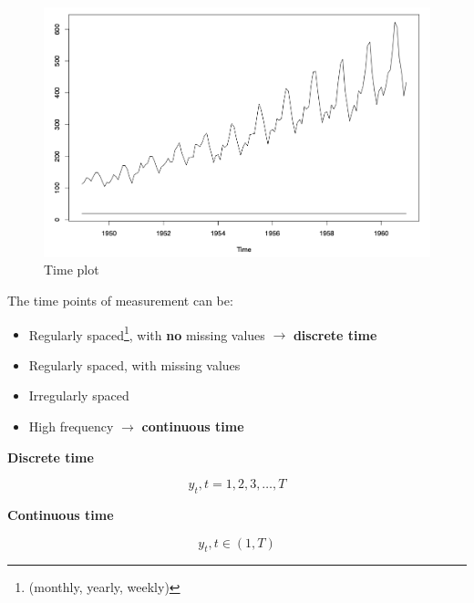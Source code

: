 \documentclass[dvipsnames,12pt]{book}
\begin{document}
                \begin{figure}[h]
                    \centering
                    \includegraphics[width=0.48\linewidth]{L1-1.png}
                    \caption{Time plot}
                    \label{fig:L1-1}
                \end{figure}

                The time points of measurement can be:

                \begin{itemize}
                    \item Regularly spaced\footnote{(monthly, yearly, weekly)}, with \textbf{no} missing values \(\rightarrow\) \textbf{discrete time}
                    \item Regularly spaced, with missing values
                    \item Irregularly spaced
                    \item High frequency \(\rightarrow\) \textbf{continuous time}
                \end{itemize}

            \begin{minipage}{0.48\textwidth}
                \textbf{Discrete time}

                    \begin{equation}
                        y_t,t = 1,2,3, \ldots , T
                    \end{equation}
                    
            \end{minipage}
            \begin{minipage}{0.04\textwidth}
                \hfill\vline\hfill
            \end{minipage}
            \begin{minipage}{0.48\textwidth}
                \textbf{Continuous time}

                    \begin{equation}
                        y_t,t \in (1,T)
                    \end{equation}
            \end{minipage}
\end{document}
